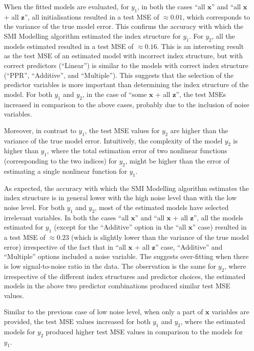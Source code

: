 \documentclass[
  11pt,
  a4paper,
]{article}
\begin{document}
When the fitted models are evaluated, for \(y_{1}\), in both the cases
``all \(\bm{x}\)'' and ``all \(\bm{x}\) + all \(\bm{z}\)'', all
initialisations resulted in a test MSE of \(\approx 0.01\), which
corresponds to the variance of the true model error. This confirms the
accuracy with which the SMI Modelling algorithm estimated the index
structure for \(y_{1}\). For \(y_{2}\), all the models estimated
resulted in a test MSE of \(\approx 0.16\). This is an interesting
result as the test MSE of an estimated model with incorrect index
structure, but with correct predictors (``Linear'') is similar to the
models with correct index structure (``PPR'', ``Additive'', and
``Multiple''). This suggests that the selection of the predictor
variables is more important than determining the index structure of the
model. For both \(y_{1}\) and \(y_{2}\), in the case of ``some
\(\bm{x}\) + all \(\bm{z}\)'', the test MSEs increased in comparison to
the above cases, probably due to the inclusion of noise variables.

Moreover, in contrast to \(y_{1}\), the test MSE values for \(y_{2}\)
are higher than the variance of the true model error. Intuitively, the
complexity of the model \(y_{2}\) is higher than \(y_{1}\), where the
total estimation error of two nonlinear functions (corresponding to the
two indices) for \(y_{2}\), might be higher than the error of estimating
a single nonlinear function for \(y_{1}\).

As expected, the accuracy with which the SMI Modelling algorithm
estimates the index structure is in general lower with the high noise
level than with the low noise level. For both \(y_{1}\) and \(y_{2}\),
most of the estimated models have selected irrelevant variables. In both
the cases ``all \(\bm{x}\)'' and ``all \(\bm{x}\) + all \(\bm{z}\)'',
all the models estimated for \(y_{1}\) (except for the ``Additive''
option in the ``all \(\bm{x}\)'' case) resulted in a test MSE of
\(\approx 0.23\) (which is slightly lower than the variance of the true
model error) irrespective of the fact that in ``all \(\bm{x}\) + all
\(\bm{z}\)'' case, ``Additive'' and ``Multiple'' options included a
noise variable. The suggests over-fitting when there is low
signal-to-noise ratio in the data. The observation is the same for
\(y_{2}\), where irrespective of the different index structures and
predictor choices, the estimated models in the above two predictor
combinations produced similar test MSE values.

Similar to the previous case of low noise level, when only a part of
\(\bm{x}\) variables are provided, the test MSE values increased for
both \(y_{1}\) and \(y_{2}\), where the estimated models for \(y_{2}\)
produced higher test MSE values in comparison to the models for
\(y_{1}\).
\end{document}
